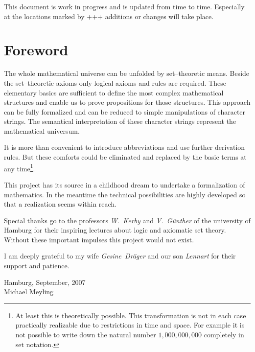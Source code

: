 \documentclass[a4paper,german,10pt,twoside]{book}
\theoremstyle{definition}
\theoremstyle{remark}
\begin{document}
\par
This document is work in progress and is updated from time to time. Especially at the locations
marked by {\glqq+++\grqq} additions or changes will take place.


\chapter*{Foreword} \label{chapter1} \hypertarget{chapter1}{}

The whole mathematical universe can be unfolded by set--theoretic means.
Beside the set--theoretic axioms only logical axioms and rules are required.
These elementary basics are sufficient to define the most complex mathematical structures and enable us to prove propositions for those structures.
This approach can be fully formalized and can be reduced to simple manipulations
of character strings. The semantical interpretation of these character strings represent the mathematical universum.

\par
It is more than convenient to introduce abbreviations and use further derivation rules. But these comforts could be eliminated and replaced by the basic terms at any time\footnote{At least this is theoretically possible. This transformation is not in each case practically realizable due to restrictions in time and space. For example it is not possible to write down the natural number $1,000,000,000$ completely in set notation.}.

\par
This project has its source in a childhood dream to undertake a formalization of mathematics. In the meantime the technical possibilities are highly developed so that a realization seems within reach.

\par
Special thanks go to the professors \emph{W.~Kerby} and \emph{V.~G{\"u}nther} of the university of Hamburg for their inspiring lectures about logic and axiomatic set theory. Without these important impulses this project would not exist.

\par
I am deeply grateful to my wife \emph{Gesine~Dr{\"a}ger} and our son \emph{Lennart} for their support and patience.          

\par
\vspace*{1cm} Hamburg, September, 2007 \\
\hspace*{\fill} Michael Meyling
\end{document}
